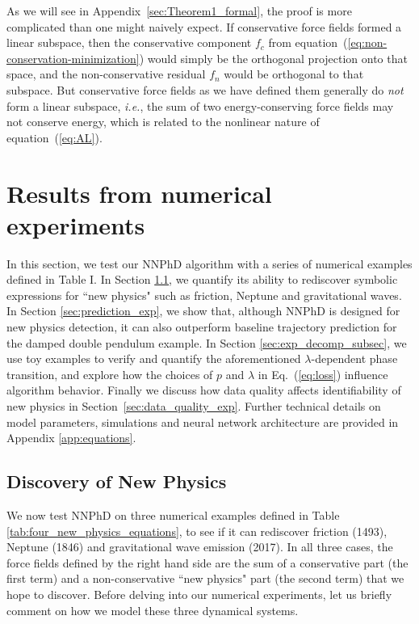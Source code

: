 \documentclass[aps,pre,reprint,superscriptaddress,nofootinbib,amsmath,amssymb]{revtex4-2}
\def\ie{{\frenchspacing\it i.e.}}
\def\eq#1{equation~(\ref{#1})}
\begin{document}
As we will see in Appendix~\ref{sec:Theorem1_formal}, the proof is more complicated than one might naively expect. If conservative force fields formed a linear subspace, then 
the conservative component $f_c$ from \eq{eq:non-conservation-minimization} 
would simply be the orthogonal projection onto that space, and the non-conservative residual $f_n$ would be orthogonal to that subspace.
But conservative force fields as we have defined them generally do {\it not} form a linear subspace, \ie, the sum of two energy-conserving force fields may not conserve energy, which is related to the nonlinear nature of \eq{eq:AL}. 


\section{Results from numerical experiments}\label{sec:experiments}

In this section, we test our NNPhD algorithm with a series of numerical examples defined in Table I. In Section \ref{sec:exp_new_physics}, we quantify its ability to rediscover symbolic expressions for ``new physics" such as friction, Neptune and gravitational waves. %
In Section \ref{sec:prediction_exp}, we show that, although NNPhD is designed for new physics detection, it can also outperform baseline trajectory prediction for the damped double pendulum example.
In Section \ref{sec:exp_decomp_subsec}, we use toy examples to verify and quantify the aforementioned $\lambda$-dependent phase transition, and explore how the choices of $p$ and $\lambda$ in Eq.~(\ref{eq:loss}) influence algorithm behavior. Finally we discuss how data quality affects identifiability of new physics in Section~\ref{sec:data_quality_exp}. Further technical details on model parameters, simulations and neural network architecture are provided in Appendix \ref{app:equations}.

\subsection{Discovery of New Physics}\label{sec:exp_new_physics}

We now test NNPhD on three numerical examples defined in Table \ref{tab:four_new_physics_equations}, to see if it can rediscover friction (1493),  Neptune (1846) and gravitational wave emission (2017). %
In all three cases, the force fields defined by the right hand side are the sum of a conservative part (the first term) and a non-conservative ``new physics" part (the second term) that we hope to discover. Before delving into our numerical experiments, let us briefly comment on how we model these three dynamical systems.
\end{document}
